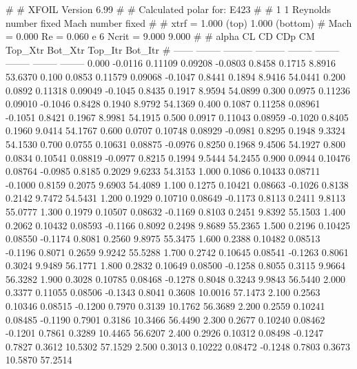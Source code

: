 #  
#       XFOIL         Version 6.99
#  
# Calculated polar for: E423                                            
#  
# 1 1 Reynolds number fixed          Mach number fixed         
#  
# xtrf =   1.000 (top)        1.000 (bottom)  
# Mach =   0.000     Re =     0.060 e 6     Ncrit =   9.000  9.000
#  
#   alpha    CL        CD       CDp       CM     Top_Xtr  Bot_Xtr  Top_Itr  Bot_Itr
#  ------ -------- --------- --------- -------- -------- -------- -------- --------
   0.000  -0.0116   0.11109   0.09208  -0.0803   0.8458   0.1715   8.8916  53.6370
   0.100   0.0853   0.11579   0.09068  -0.1047   0.8441   0.1894   8.9416  54.0441
   0.200   0.0892   0.11318   0.09049  -0.1045   0.8435   0.1917   8.9594  54.0899
   0.300   0.0975   0.11236   0.09010  -0.1046   0.8428   0.1940   8.9792  54.1369
   0.400   0.1087   0.11258   0.08961  -0.1051   0.8421   0.1967   8.9981  54.1915
   0.500   0.0917   0.11043   0.08959  -0.1020   0.8405   0.1960   9.0414  54.1767
   0.600   0.0707   0.10748   0.08929  -0.0981   0.8295   0.1948   9.3324  54.1530
   0.700   0.0755   0.10631   0.08875  -0.0976   0.8250   0.1968   9.4506  54.1927
   0.800   0.0834   0.10541   0.08819  -0.0977   0.8215   0.1994   9.5444  54.2455
   0.900   0.0944   0.10476   0.08764  -0.0985   0.8185   0.2029   9.6233  54.3153
   1.000   0.1086   0.10433   0.08711  -0.1000   0.8159   0.2075   9.6903  54.4089
   1.100   0.1275   0.10421   0.08663  -0.1026   0.8138   0.2142   9.7472  54.5431
   1.200   0.1929   0.10710   0.08649  -0.1173   0.8113   0.2411   9.8113  55.0777
   1.300   0.1979   0.10507   0.08632  -0.1169   0.8103   0.2451   9.8392  55.1503
   1.400   0.2062   0.10432   0.08593  -0.1166   0.8092   0.2498   9.8689  55.2365
   1.500   0.2196   0.10425   0.08550  -0.1174   0.8081   0.2560   9.8975  55.3475
   1.600   0.2388   0.10482   0.08513  -0.1196   0.8071   0.2659   9.9242  55.5288
   1.700   0.2742   0.10645   0.08541  -0.1263   0.8061   0.3024   9.9489  56.1771
   1.800   0.2832   0.10649   0.08500  -0.1258   0.8055   0.3115   9.9664  56.3282
   1.900   0.3028   0.10785   0.08468  -0.1278   0.8048   0.3243   9.9843  56.5440
   2.000   0.3377   0.11055   0.08506  -0.1343   0.8041   0.3608  10.0016  57.1473
   2.100   0.2563   0.10346   0.08515  -0.1200   0.7970   0.3139  10.1762  56.3689
   2.200   0.2559   0.10241   0.08485  -0.1190   0.7901   0.3186  10.3466  56.4490
   2.300   0.2677   0.10240   0.08462  -0.1201   0.7861   0.3289  10.4465  56.6207
   2.400   0.2926   0.10312   0.08498  -0.1247   0.7827   0.3612  10.5302  57.1529
   2.500   0.3013   0.10222   0.08472  -0.1248   0.7803   0.3673  10.5870  57.2514
